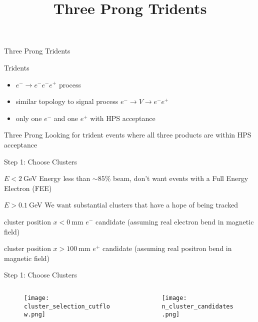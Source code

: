 \documentclass[aspectratio=169]{beamer}
\title[HPS TPT]{Three Prong Tridents}
\begin{document}
\begin{frame}
  \maketitle
\end{frame}

\begin{frame}{Three Prong Tridents}
  \begin{block}{Tridents}
    \begin{itemize}
      \item $e^-\to e^- e^- e^+$ process
      \item similar topology to signal process $e^- \to V \to e^- e^+$
      \item {} only one $e^-$ and one $e^+$ with HPS acceptance
    \end{itemize}
  \end{block}
  \vfill
  \begin{block}{Three Prong}
    Looking for trident events where all three products are within HPS acceptance
  \end{block}
\end{frame}

\begin{frame}{Step 1: Choose Clusters}
  \begin{block}{$E < 2~$GeV}
    Energy less than $\sim85\%$ beam, don't want events with a Full Energy Electron (FEE)
  \end{block}
  \begin{block}{$E > 0.1~$GeV}
    We want substantial clusters that have a hope of being tracked
  \end{block}
  \begin{block}{cluster position $x < 0~$mm}
    $e^-$ candidate (assuming real electron bend in magnetic field)
  \end{block}
  \begin{block}{cluster position $x > 100~$mm} 
    $e^+$ candidate (assuming real positron bend in magnetic field)
  \end{block}
\end{frame}

\begin{frame}{Step 1: Choose Clusters}
  \begin{columns}
    \begin{column}{0.5\textwidth}
      \begin{figure}
        \centering
        \texttt{[image: cluster\_selection\_cutflow.png]}
      \end{figure}
    \end{column}
    \begin{column}{0.5\textwidth}
      \begin{figure}
        \centering
        \texttt{[image: n\_cluster\_candidates.png]}
      \end{figure}
    \end{column}
  \end{columns}
\end{frame}
\end{document}
